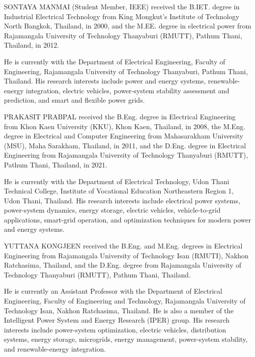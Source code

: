 \begin{IEEEbiography}{SONTAYA MANMAI}
(Student Member, IEEE) received the B.IET. degree in Industrial
Electrical Technology from King Mongkut's Institute of Technology
North Bangkok, Thailand, in 2000, and the M.EE. degree in electrical
power from Rajamangala University of Technology Thanyaburi (RMUTT),
Pathum Thani, Thailand, in 2012.

He is currently with the Department of Electrical Engineering,
Faculty of Engineering, Rajamangala University of Technology
Thanyaburi, Pathum Thani, Thailand. His research interests include
power and energy systems, renewable-energy integration, electric
vehicles, power-system stability assessment and prediction, and
smart and flexible power grids.
\end{IEEEbiography}


\begin{IEEEbiography}{PRAKASIT PRABPAL}
received the B.Eng. degree in Electrical Engineering from
Khon Kaen University (KKU), Khon Kaen, Thailand, in 2008,
the M.Eng. degree in Electrical and Computer Engineering from
Mahasarakham University (MSU), Maha Sarakham, Thailand, in 2011,
and the D.Eng. degree in Electrical Engineering from Rajamangala
University of Technology Thanyaburi (RMUTT), Pathum Thani,
Thailand, in 2021.

He is currently with the Department of Electrical Technology,
Udon Thani Technical College, Institute of Vocational Education
Northeastern Region 1, Udon Thani, Thailand. His research interests
include electrical power systems, power-system dynamics, energy
storage, electric vehicles, vehicle-to-grid applications, smart-grid
operation, and optimization techniques for modern power and energy
systems.
\end{IEEEbiography}


\begin{IEEEbiography}{YUTTANA KONGJEEN}
received the B.Eng. and M.Eng. degrees in Electrical Engineering
from Rajamangala University of Technology Isan (RMUTI),
Nakhon Ratchasima, Thailand, and the D.Eng. degree from
Rajamangala University of Technology Thanyaburi (RMUTT),
Pathum Thani, Thailand.

He is currently an Assistant Professor with the Department of
Electrical Engineering, Faculty of Engineering and Technology,
Rajamangala University of Technology Isan, Nakhon Ratchasima,
Thailand. He is also a member of the Intelligent Power System and
Energy Research (IPER) group. His research interests include
power-system optimization, electric vehicles, distribution systems,
energy storage, microgrids, energy management, power-system
stability, and renewable-energy integration.
\end{IEEEbiography}


